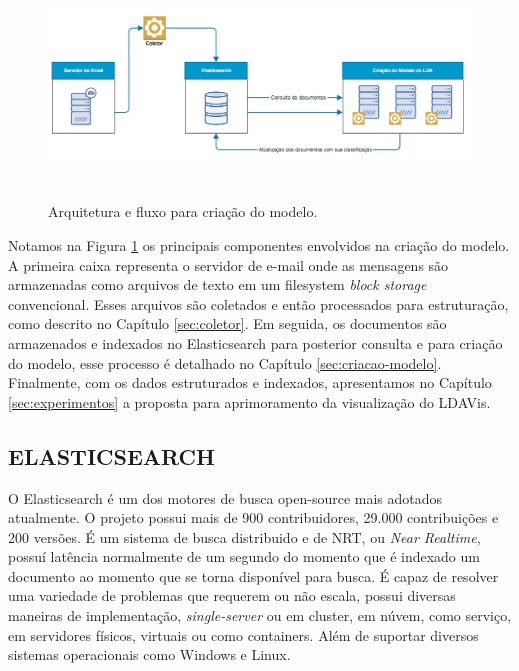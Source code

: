 \documentclass[12pt,a4paper]{article}
\begin{document}
 \begin{figure}[H]
	\centering
    \includegraphics[height=6cm]{images/figure_11.jpg}
    \caption{Arquitetura e fluxo para criação do modelo.}
    \label{fig-framework-lda}
\end{figure}

Notamos na Figura \ref{fig-framework-lda} os principais componentes envolvidos na criação do modelo. A primeira caixa representa o servidor de 
 e-mail onde as mensagens são armazenadas como arquivos de texto em um filesystem \textit{block storage} convencional. Esses arquivos são coletados e então
 processados para estruturação, como descrito no Capítulo \ref{sec:coletor}. Em seguida, os documentos são armazenados e indexados no Elasticsearch para
 posterior consulta e para criação do modelo, esse processo é detalhado no Capítulo \ref{sec:criacao-modelo}. Finalmente, com os dados estruturados
 e indexados, apresentamos no Capítulo \ref{sec:experimentos} a proposta para aprimoramento da visualização do LDAVis.

\subsection{ELASTICSEARCH} \label{sec:elasticsearch}

O Elasticsearch é um dos motores de busca open-source mais adotados atualmente. O projeto possui mais de 900 contribuidores, 29.000
 contribuições e 200 versões. É um sistema de busca distribuido  e de NRT, ou \textit{Near Realtime}, possuí latência normalmente de um segundo
 do momento que é indexado um documento ao momento que se torna disponível para busca. É capaz de resolver uma variedade de problemas que requerem ou não escala,
 possui diversas maneiras de implementação, \textit{single-server} ou em cluster, em núvem, como serviço, em servidores físicos, virtuais ou como containers.
 Além de suportar diversos sistemas operacionais como Windows e Linux.
\end{document}
